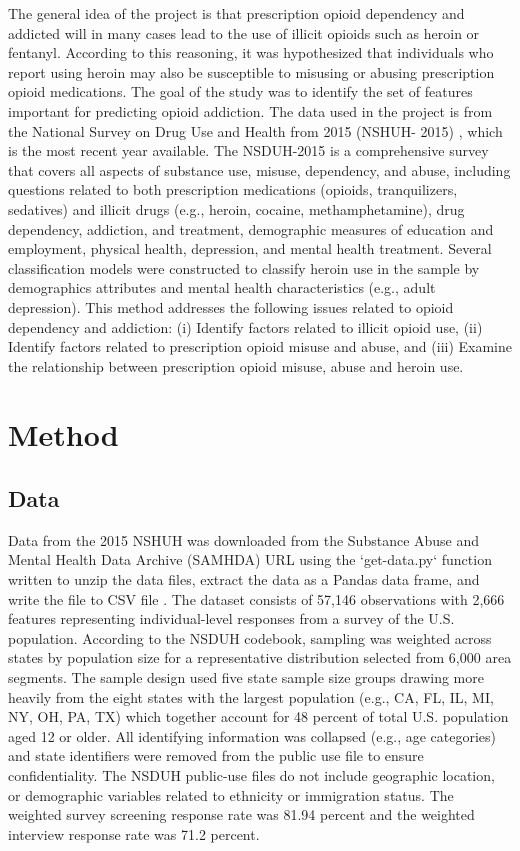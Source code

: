 \documentclass[sigconf]{acmart}
\begin{document}
The general idea of the project is that prescription opioid dependency and
addicted will in many cases lead to the use of illicit opioids such as heroin 
or fentanyl. According to this reasoning, it was hypothesized that individuals 
who report using heroin may also be susceptible to misusing or abusing 
prescription opioid medications. The goal of the study was to identify the set 
of features important for predicting opioid addiction. The data used in the 
project is from the National Survey on Drug Use and Health from 2015 (NSHUH-
2015) \cite{samhsa16}, which is the most recent year available. The NSDUH-2015 
is a comprehensive survey that covers all aspects of substance use, misuse, 
dependency, and abuse, including questions related to both prescription 
medications (opioids, tranquilizers, sedatives) and illicit drugs (e.g., 
heroin, cocaine, methamphetamine), drug dependency, addiction, and treatment, 
demographic measures of education and employment, physical health, depression, 
and mental health treatment. Several classification models were constructed to 
classify heroin use in the sample by demographics attributes and mental health 
characteristics (e.g., adult depression). This method addresses the following
issues related to opioid dependency and addiction: (i) Identify factors related 
to illicit opioid use, (ii) Identify factors related to prescription opioid 
misuse and abuse, and (iii) Examine the relationship between prescription 
opioid misuse, abuse and heroin use. 


\section{Method}

\subsection{Data} 

Data from the 2015 NSHUH was downloaded from the Substance Abuse and Mental 
Health Data Archive (SAMHDA) \cite{samhsa16} URL using the `get-data.py` 
function written to unzip the data files, extract the data as a Pandas data 
frame, and write the file to CSV file \cite{getdata17}. The dataset consists 
of 57,146 observations with 2,666 features representing individual-level 
responses from a survey of the U.S. population. According to the NSDUH 
codebook, sampling was weighted across states by population size for a 
representative distribution selected from 6,000 area segments. The sample 
design used five state sample size groups drawing more heavily from the eight 
states with the largest population (e.g., CA, FL, IL, MI, NY, OH, PA, TX) which 
together account for 48 percent of total U.S. population aged 12 or older. 
All identifying information was collapsed (e.g., age categories) and state 
identifiers were removed from the public use file to ensure confidentiality. 
The NSDUH public-use files do not include geographic location, or demographic 
variables related to ethnicity or immigration status. The weighted survey 
screening response rate was 81.94 percent and the weighted interview response 
rate was 71.2 percent. 
\end{document}
